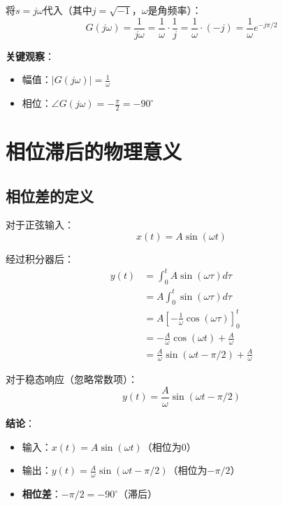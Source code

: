 \documentclass[12pt,a4paper]{article}
\begin{document}
将$s = j\omega$代入（其中$j = \sqrt{-1}$，$\omega$是角频率）：
\begin{equation}
G(j\omega) = \frac{1}{j\omega} = \frac{1}{\omega} \cdot \frac{1}{j} = \frac{1}{\omega} \cdot (-j) = \frac{1}{\omega} e^{-j\pi/2}
\end{equation}

\textbf{关键观察}：
\begin{itemize}
\item 幅值：$|G(j\omega)| = \frac{1}{\omega}$
\item 相位：$\angle G(j\omega) = -\frac{\pi}{2} = -90^\circ$
\end{itemize}

\section{相位滞后的物理意义}

\subsection{相位差的定义}

对于正弦输入：
\begin{equation}
x(t) = A \sin(\omega t)
\end{equation}

经过积分器后：
\begin{align}
y(t) &= \int_0^t A \sin(\omega \tau) d\tau \\
     &= A \int_0^t \sin(\omega \tau) d\tau \\
     &= A \left[-\frac{1}{\omega}\cos(\omega \tau)\right]_0^t \\
     &= -\frac{A}{\omega}\cos(\omega t) + \frac{A}{\omega} \\
     &= \frac{A}{\omega}\sin(\omega t - \pi/2) + \frac{A}{\omega}
\end{align}

对于稳态响应（忽略常数项）：
\begin{equation}
y(t) = \frac{A}{\omega}\sin(\omega t - \pi/2)
\end{equation}

\textbf{结论}：
\begin{itemize}
\item 输入：$x(t) = A\sin(\omega t)$（相位为0）
\item 输出：$y(t) = \frac{A}{\omega}\sin(\omega t - \pi/2)$（相位为$-\pi/2$）
\item \textbf{相位差}：$-\pi/2 = -90^\circ$（滞后）
\end{itemize}
\end{document}

